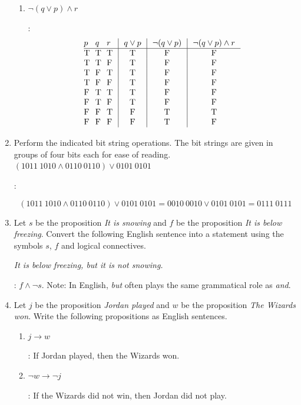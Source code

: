 \documentclass[11pt]{amsart}
\begin{document}
\begin{enumerate}
\begin{enumerate}
\item $\neg (q\vee p)\wedge r$

:
$$\vbox{\offinterlineskip
\halign { \strut # & # & # & \vrule ~~# & \vrule ~~# & \vrule ~~# \cr
$p$ & $q$ & $r$ & $q\vee p$ & $\neg (q\vee p)$ & $\neg (q\vee p)\wedge r$ \cr
\noalign{\hrule}
T   &  T   &  T   &  T  &  F  &  F \cr
T   &  T   &  F   &  T  &  F  &  F \cr
T   &  F   &  T   &  T  &  F  &  F \cr
T   &  F   &  F   &  T  &  F  &  F \cr
F   &  T   &  T   &  T  &  F  &  F \cr
F   &  T   &  F   &  T  &  F  &  F \cr
F   &  F   &  T   &  F  &  T  &  T \cr
F   &  F   &  F   &  F  &  T  &  F \cr
}}$$

\end{enumerate}


\item Perform the indicated bit string operations. The bit strings are given
in groups of four bits each for ease of reading. 
$(1011~1010 \wedge 0110~0110)\vee 0101~0101$

: 

$$(1011~1010 \wedge 0110~0110)\vee 0101~0101 = 0010~0010 \vee 0101~0101 = 0111~0111$$


\item Let $s$ be the proposition {\it It is snowing} and $f$ be the proposition 
{\it It is below freezing}. Convert the following English sentence into a statement
using the symbols $s$, $f$ and logical connectives.

{\it It is below freezing, but it is not snowing.}

: $f\wedge \neg s$. Note: In English, {\it but} often plays the same grammatical role as {\it and}.


\item Let $j$ be the proposition {\it Jordan played} and $w$ be the proposition 
{\it The Wizards won}.
Write the following propositions as English sentences. 

\begin{enumerate}

\item $j\longrightarrow w$ 

: If Jordan played, then the Wizards won.


\item $\neg w \longrightarrow \neg j$

: If the Wizards did not win, then Jordan did not play.

\end{enumerate}


\end{enumerate}
\end{document}
